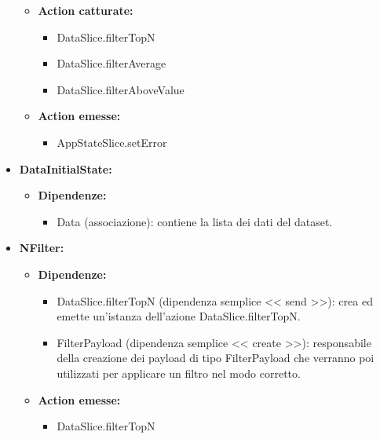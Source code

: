 \begin{itemize}
\begin{itemize}
        \item \textbf{Action catturate:}
        \begin{itemize}
            \item DataSlice.filterTopN
            \item DataSlice.filterAverage
            \item DataSlice.filterAboveValue
        \end{itemize} 
        \item \textbf{Action emesse:}
        \begin{itemize}
            \item AppStateSlice.setError
        \end{itemize} 
    \end{itemize}

    \item \textbf{DataInitialState:}
    \begin{itemize}
        \item \textbf{Dipendenze:}
        \begin{itemize}
            \item Data (associazione): contiene la lista dei dati del dataset.
        \end{itemize} 
    \end{itemize}

    \item \textbf{NFilter:}
    \begin{itemize}
        \item \textbf{Dipendenze:}
        \begin{itemize}
            \item DataSlice.filterTopN (dipendenza semplice << send >>): crea ed emette un’istanza dell’azione DataSlice.filterTopN.
            \item FilterPayload (dipendenza semplice << create >>): responsabile della creazione dei payload di tipo FilterPayload che verranno poi utilizzati per applicare un filtro nel modo corretto.
        \end{itemize} 
        \item \textbf{Action emesse:}
        \begin{itemize}
            \item DataSlice.filterTopN
        \end{itemize} 
    \end{itemize}


\end{itemize}
